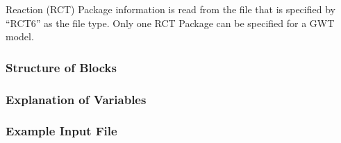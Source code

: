 Reaction (RCT) Package information is read from the file that is specified by ``RCT6'' as the file type.  Only one RCT Package can be specified for a GWT model. 

\vspace{5mm}
\subsubsection{Structure of Blocks}



\vspace{5mm}
\subsubsection{Explanation of Variables}
\begin{description}

\end{description}

\vspace{5mm}
\subsubsection{Example Input File}



